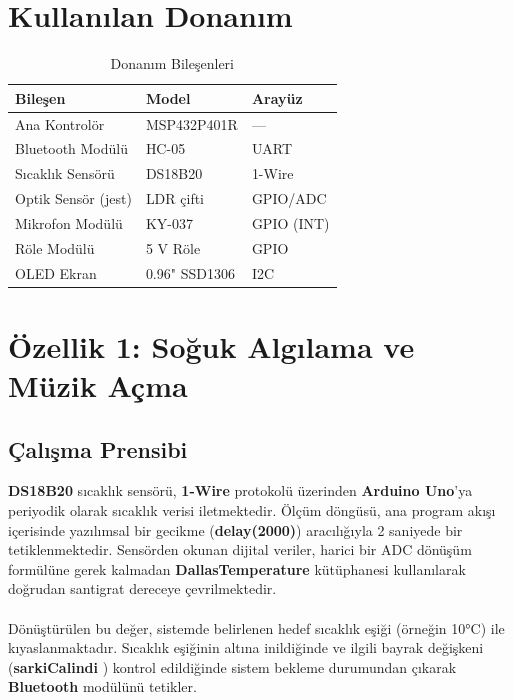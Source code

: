 \documentclass[12pt, a4paper]{article}
\begin{document}
\section{Kullanılan Donanım}

\begin{table}[H]
  \centering
  \caption{Donanım Bileşenleri}
  \label{tab:donanim}
  \begin{tabular}{lll}
    \toprule
    \textbf{Bileşen}          & \textbf{Model}      & \textbf{Arayüz} \\
    \midrule
    Ana Kontrolör             & MSP432P401R         & —         \\
    Bluetooth Modülü          & HC-05               & UART      \\
    Sıcaklık Sensörü          & DS18B20             & 1-Wire    \\
    Optik Sensör (jest)       & LDR çifti           & GPIO/ADC  \\
    Mikrofon Modülü           & KY-037              & GPIO (INT)\\
    Röle Modülü               & 5 V Röle            & GPIO      \\
    OLED Ekran                & 0.96" SSD1306       & I2C       \\
    \bottomrule
  \end{tabular}
\end{table}

\section{Özellik 1: Soğuk Algılama ve Müzik Açma}

\subsection{Çalışma Prensibi}

\textbf{DS18B20} sıcaklık sensörü, \textbf{1-Wire} protokolü üzerinden \textbf{Arduino Uno}'ya periyodik olarak sıcaklık verisi iletmektedir. Ölçüm döngüsü, ana program akışı içerisinde yazılımsal bir gecikme (\textbf{delay(2000)}) aracılığıyla 2 saniyede bir tetiklenmektedir. Sensörden okunan dijital veriler, harici bir ADC dönüşüm formülüne gerek kalmadan \textbf{DallasTemperature} kütüphanesi kullanılarak doğrudan santigrat dereceye çevrilmektedir.
\\ \\
Dönüştürülen bu değer, sistemde belirlenen hedef sıcaklık eşiği (örneğin 10°C) ile kıyaslanmaktadır. Sıcaklık eşiğinin altına inildiğinde ve ilgili bayrak değişkeni (\textbf{sarkiCalindi} ) kontrol edildiğinde sistem bekleme durumundan çıkarak \textbf{Bluetooth} modülünü tetikler.
\end{document}
